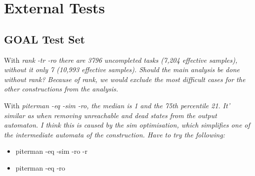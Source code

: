 \section{External Tests}

\subsection{GOAL Test Set}

With \em{rank -tr -ro} there are 3796 uncompleted tasks (7,204 effective samples), without it only 7 (10,993 effective samples). Should the main analysis be done without rank? Because of rank, we would exclude the most difficult cases for the other constructions from the analysis.

With \em{piterman -eq -sim -ro}, the median is 1 and the 75th percentile 21. It' similar as when removing unreachable and dead states from the output automaton. I think this is caused by the sim optimisation, which simplifies one of the intermediate automata of the construction. Have to try the following:

\begin{itemize}
\item piterman -eq -sim -ro -r
\item piterman -eq -ro
\end{itemize}
